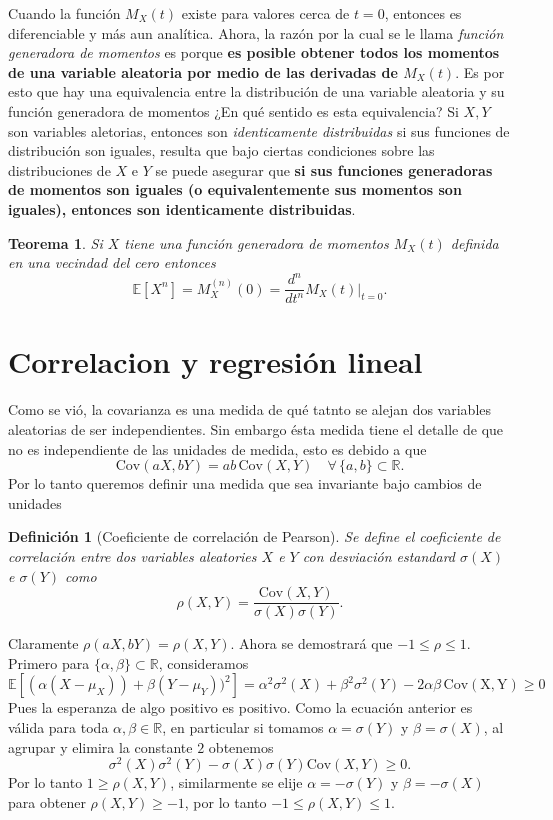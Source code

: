 \documentclass[letterpaper]{book}
\newtheorem{teorema}{Teorema}[section]
\newtheorem{def.}{Definici\'on}[section]
\newcommand{\esp}{\mathbb E}
\newcommand{\re}{\ensuremath{\mathbb R }}
\begin{document}
\noindent Cuando la función \(M_X(t)\) existe para valores cerca de \(t=0\), entonces es diferenciable y más aun analítica. Ahora, la razón por la cual se le llama \emph{función generadora de momentos} es porque \textbf{es posible obtener todos los momentos de una variable aleatoria por medio de las derivadas de \(M_X(t)\)}. Es por esto que hay una equivalencia entre la distribución de una variable aleatoria y su función generadora de momentos ¿En qué sentido es esta equivalencia? Si \(X,Y\) son variables aletorias, entonces son \emph{identicamente distribuidas} si sus funciones de distribución son iguales, resulta que bajo ciertas condiciones sobre las distribuciones de \(X\) e \(Y\) se puede asegurar que \textbf{si sus funciones generadoras de momentos son iguales (o equivalentemente sus momentos son iguales), entonces son identicamente distribuidas}.
\begin{teorema}
Si $X$ tiene una función generadora de momentos $M_X(t)$ definida en una vecindad del cero entonces
\[
\esp[X^n]=M_X^{(n)}(0)=\dfrac{d^n}{dt^n}M_X(t)\vert_{t=0}.
\]
\end{teorema}
\section{Correlacion y regresión lineal}
\label{sec:org53b15fd}
\noindent Como se vió, la covarianza es una medida de qué tatnto se alejan dos variables aleatorias de ser independientes. Sin embargo ésta medida tiene el detalle de que no es independiente de las unidades de medida, esto es debido a que
\[
\mathrm{Cov}(aX,bY)=ab\,\mathrm{Cov}(X,Y)\quad\forall\,\{a,b\}\subset\re.
\]
\noindent Por lo tanto queremos definir una medida que sea invariante bajo cambios de unidades
\begin{def.}[Coeficiente de correlación de Pearson]
Se define el \emph{coeficiente de correlación} entre dos variables aleatories \(X\) e \(Y\) con desviación estandard \(\sigma(X)\) e \(\sigma(Y)\) como
\[
\rho(X,Y)=\frac{\mathrm{Cov}(X,Y)}{\sigma(X)\sigma(Y)}.
\]
\end{def.}
\noindent Claramente \(\rho(aX,bY)=\rho(X,Y)\). Ahora se demostrará que \(-1\leq\rho\leq1\). Primero para \(\{\alpha,\beta\}\subset\re\), consideramos
\begin{equation}
\esp[(\alpha(X-\mu_X))+\beta(Y-\mu_Y))^2]=\alpha^2\sigma^2(X)+\beta^2\sigma^2(Y)-2\alpha\beta\,\mathrm{Cov(X,Y)}\geq 0
\end{equation}
\noindent Pues la esperanza de algo positivo es positivo. Como la ecuación anterior es válida para toda \(\alpha,\beta\in\re\), en particular si tomamos \(\alpha=\sigma(Y)\) y \(\beta=\sigma(X)\), al agrupar y elimira la constante \(2\) obtenemos
\[
\sigma^2(X)\sigma^2(Y)-\sigma(X)\sigma(Y)\mathrm{Cov}(X,Y)\geq0.
\]
\noindent Por lo tanto \(1\geq\rho(X,Y)\), similarmente se elije \(\alpha=-\sigma(Y)\) y \(\beta=-\sigma(X)\) para obtener \(\rho(X,Y)\geq-1\), por lo tanto \(-1\leq\rho(X,Y)\leq1\).
\end{document}

